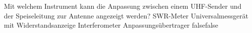     {Mit welchem Instrument kann die Anpassung zwischen einem UHF-Sender und der Speiseleitung zur Antenne angezeigt werden?}
    {SWR-Meter}
    {Universalmessgerät mit Widerstandsanzeige}
    {Interferometer}
    {Anpassungsübertrager}
    {false}{false}